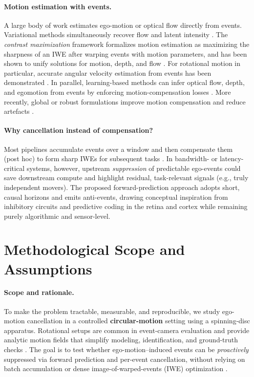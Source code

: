 \paragraph{Motion estimation with events.}
A large body of work estimates ego-motion or optical flow directly from events. Variational methods simultaneously recover flow and latent intensity \cite{Bardow2016SOFIE}. The \emph{contrast maximization} framework formalizes motion estimation as maximizing the sharpness of an IWE after warping events with motion parameters, and has been shown to unify solutions for motion, depth, and flow \cite{Gallego2018CMax}. For rotational motion in particular, accurate angular velocity estimation from events has been demonstrated \cite{Gallego2017Angular}. In parallel, learning-based methods can infer optical flow, depth, and egomotion from events by enforcing motion-compensation losses \cite{Zhu2019Unsupervised}. More recently, global or robust formulations improve motion compensation and reduce artefacts \cite{Xu2020SmoothMC}.

\paragraph{Why cancellation instead of compensation?}
Most pipelines accumulate events over a window and then compensate them (post hoc) to form sharp IWEs for subsequent tasks \cite{Gallego2018CMax,Stoffregen2019Segmentation}. In bandwidth- or latency-critical systems, however, upstream \emph{suppression} of predictable ego-events could save downstream compute and highlight residual, task-relevant signals (e.g., truly independent movers). The proposed forward-prediction approach adopts short, causal horizons and emits anti-events, drawing conceptual inspiration from inhibitory circuits and predictive coding in the retina and cortex \cite{Hosoya2005Dynamic,Rao1999Predictive} while remaining purely algorithmic and sensor-level.

\section{Methodological Scope and Assumptions}
\label{sec:scope-assumptions}

\paragraph{Scope and rationale.}
To make the problem tractable, measurable, and reproducible, we study ego-motion cancellation in a controlled \textbf{circular-motion} setting using a spinning-disc apparatus. Rotational setups are common in event-camera evaluation and provide analytic motion fields that simplify modeling, identification, and ground-truth checks \cite{Gallego2017Angular,Stoffregen2019Segmentation}. The goal is to test whether ego-motion–induced events can be \emph{proactively} suppressed via forward prediction and per-event cancellation, without relying on batch accumulation or dense image-of-warped-events (IWE) optimization \cite{Gallego2018CMax,Bardow2016SOFIE}.

